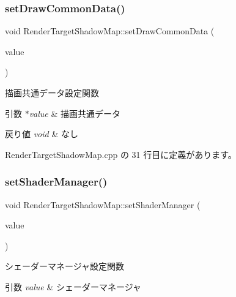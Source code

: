 \subsubsection{\texorpdfstring{set\+Draw\+Common\+Data()}{setDrawCommonData()}}
{\footnotesize\ttfamily void Render\+Target\+Shadow\+Map\+::set\+Draw\+Common\+Data (\begin{DoxyParamCaption}\item[{\mbox{\hyperlink{class_draw_common_data}{Draw\+Common\+Data}} $\ast$}]{value }\end{DoxyParamCaption})}



描画共通データ設定関数 


\begin{DoxyParams}{引数}
{\em $\ast$value} & 描画共通データ \\
\hline
\end{DoxyParams}

\begin{DoxyRetVals}{戻り値}
{\em void} & なし \\
\hline
\end{DoxyRetVals}


 Render\+Target\+Shadow\+Map.\+cpp の 31 行目に定義があります。

\mbox{\label{class_render_target_shadow_map_a25dfdffef70779c1a2eaaa6f2ebbf2d4}} 
\subsubsection{\texorpdfstring{set\+Shader\+Manager()}{setShaderManager()}}
{\footnotesize\ttfamily void Render\+Target\+Shadow\+Map\+::set\+Shader\+Manager (\begin{DoxyParamCaption}\item[{\mbox{\hyperlink{class_shader_manager}{Shader\+Manager}} $\ast$}]{value }\end{DoxyParamCaption})}



シェーダーマネージャ設定関数 


\begin{DoxyParams}{引数}
{\em value} & シェーダーマネージャ \\
\hline
\end{DoxyParams}

